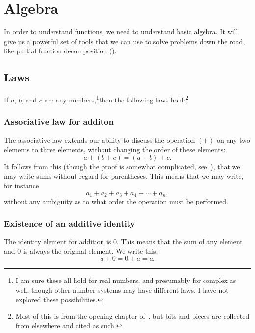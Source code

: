\chapter{Algebra}

In order to understand functions, we need to understand basic algebra. It will
give us a powerful set of tools that we can use to solve problems down the road,
like partial fraction decomposition ().

\section{Laws}
If $a$, $b$, and $c$ are any numbers,\footnote{%
I am sure these all hold for real numbers, and presumably for complex as well,
though other number systems may have different laws.
I have not explored these possibilities.
}then the following laws hold:\footnote{%
Most of this is from the opening chapter of~\cite{spivak}, but bits and pieces
are collected from elsewhere and cited as such.
}
\subsection{Associative law for additon}
\label{sec:alg:assoc:add}
The associative law extends our ability to discuss the operation $(+)$ on any 
two elements to three elements, without changing the order of these elements:
\begin{equation}
    a + ( b + c ) = (a + b) + c.
\end{equation}
It follows from this (though the proof is somewhat complicated, see~\cite[p.~4]{spivak}),
that we may write sums without regard for parentheses.
This means that we may write, for instance
\begin{equation*}
    a_1 + a_2 + a_3 + a_4 + \cdots + a_n,
\end{equation*}
without any ambiguity as to what order the operation must be performed.

\subsection{Existence of an additive identity}
The identity element for addition is 0.
This means that the sum of any element and 0 is always the original element.
We write this:
\begin{equation}
    a + 0 = 0 + a = a.
\end{equation}

